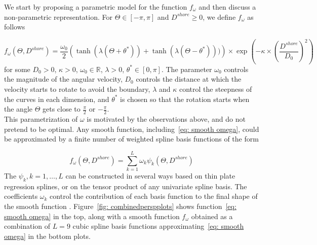 \documentclass[aoas]{imsart}
\theoremstyle{definition}
\theoremstyle{remark}
\theoremstyle{remark}
\newcommand {\R}{\mathbb{R}}
\newcommand {\1}{\mathbb{1}}
\begin{document}
We start by proposing a parametric model for the function $f_{\omega}$ and then discuss a non-parametric representation. For $\Theta \in [-\pi,\pi]$ and $D^{shore} \geq0$, we define $f_{\omega}$ as follows

\begin{equation}
	\label{eq: smooth omega}
	f_{\omega}(\Theta,D^{shore})=\frac{\omega_0}{2}\left(\tanh(\lambda(\Theta+\theta^{*}))+\tanh(\lambda(\Theta-\theta^{*})))\right)\times \exp\left(-\kappa \times \left(\frac{D^{shore}}{D_0}\right)^2\right)
\end{equation}
for some $D_0>0$, $\kappa>0$, $\omega_0 \in \R$, $\lambda>0$, $\theta^* \in [0,\pi]$.
The parameter $\omega_0$ controls the magnitude of the angular velocity, $D_0$ controls the distance at which the velocity starts to rotate to avoid the boundary, $\lambda$ and $\kappa$ control the steepness of the curves in each dimension, and $\theta^*$ is chosen so that the rotation starts when the angle $\Theta$ gets close to $\frac{\pi}{2}$ or $-\frac{\pi}{2}$. \\

This parametrization of $\omega$ is motivated by the observations above, and do not pretend to be optimal. 
Any smooth function, including~\eqref{eq: smooth omega}, could be approximated by a finite number of weighted spline basis functions of the form

\[f_\omega(\Theta,D^{shore})=\sum_{k=1}^L \omega_k \psi_k(\Theta,D^{shore})\]
The $\psi_k, k=1, \ldots, L$ can be constructed in several ways based on thin plate regression splines, or on the tensor product of any univariate spline basis. The coefficients $\omega_k$ control the contribution of each basis function to the final shape of the smooth function \citep{wood_generalized_2017}. Figure~\ref{fig: combinedperspplots}  shows function~\eqref{eq: smooth omega} in the top, along with a smooth function $f_{\omega}$ obtained as a combination of $L=9$ cubic spline basis functions approximating~\eqref{eq: smooth omega} in the bottom plots. 
\end{document}
